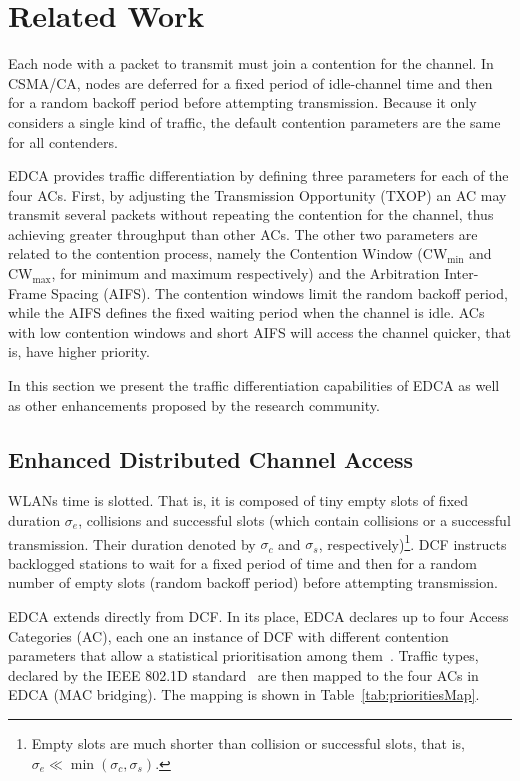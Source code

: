 \section{Related Work}\label{section2}
Each node with a packet to transmit must join a contention for the channel. In CSMA/CA, nodes are deferred for a fixed period of idle-channel time and then for a random backoff period before attempting transmission. Because it only considers a single kind of traffic, the default contention parameters are the same for all contenders. 

EDCA provides traffic differentiation by defining three parameters for each of the four ACs. First, by adjusting the Transmission Opportunity (TXOP) an AC may transmit several packets without repeating the contention for the channel, thus achieving greater throughput than other ACs. The other two parameters are related to the contention process, namely the Contention Window (CW$_{\min}$ and CW$_{\max}$, for minimum and maximum respectively) and the Arbitration Inter-Frame Spacing (AIFS). The contention windows limit the random backoff period, while the AIFS defines the fixed waiting period when the channel is idle. ACs with low contention windows and short AIFS will access the channel quicker, that is, have higher priority.

In this section we present the traffic differentiation capabilities of EDCA as well as other enhancements proposed by the research community.

\subsection{Enhanced Distributed Channel Access}\label{EDCA}
WLANs time is slotted. That is, it is composed of tiny empty slots of fixed duration $\sigma_{e}$, collisions and successful slots (which contain collisions or a successful transmission. Their duration denoted by $\sigma_{c}$ and $\sigma_{s}$, respectively)\footnote{Empty slots are much shorter than collision or successful slots, that is, $\sigma_{e}\ll\min(\sigma_{c},\sigma_{s})$.}. DCF instructs backlogged stations to wait for a fixed period of time and then for a random number of empty slots (random backoff period) before attempting transmission.

EDCA extends directly from DCF. In its place, EDCA declares up to four Access Categories (AC), each one an instance of DCF with different contention parameters that allow a statistical prioritisation among them~\cite{perahia2013next}. Traffic types, declared by the IEEE 802.1D standard~\cite{8021d} are then mapped to the four ACs in EDCA (MAC bridging). The mapping is shown in Table~\ref{tab:prioritiesMap}.


